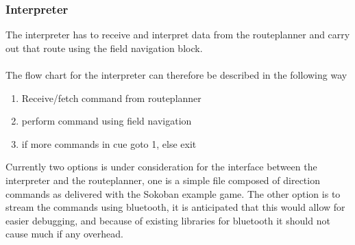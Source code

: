 \documentclass[draft, english, a4paper]{article}
\begin{document}
		\subsubsection{Interpreter} %
		    The interpreter has to receive and interpret data from the routeplanner
		    and carry out that route using the field navigation block.\\
		    \\
		    The flow chart for the interpreter can therefore be described in the
		    following way
		    \begin{enumerate}
		    \item Receive/fetch command from routeplanner
		    \item perform command using field navigation
		    \item if more commands in cue goto 1, else exit
		    \end{enumerate}
		    Currently two options is under consideration for the interface between
		    the interpreter and the routeplanner, one is a simple file composed
		    of direction commands as delivered with the Sokoban example game.
		    The other option is to stream the commands using bluetooth, it is
		    anticipated that this would allow for easier debugging, and because
		    of existing libraries for bluetooth it should not cause much if any overhead.\\
		    \\
\end{document}
